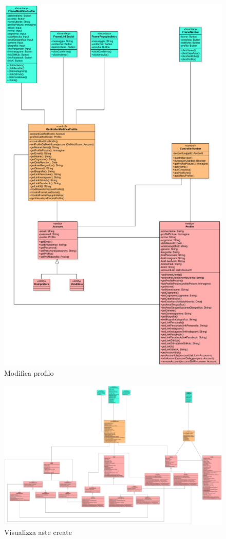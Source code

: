             \begin{figure}[htbp!]
                \centering
                    \includegraphics[width=0.8\linewidth]{Immagini/Diagrammi/Class Diagram/Utente che ha effettuato l'accesso/ModificaProfilo.pdf}
                \caption{Modifica profilo}
            \end{figure}
            
            \begin{figure}[htbp!]
                \centering
                    \includegraphics[width=1\linewidth]{Immagini/Diagrammi/Class Diagram/Utente che ha effettuato l'accesso/VisualizzaAsteCreate.pdf}
                \caption{Visualizza aste create}
            \end{figure}
            
